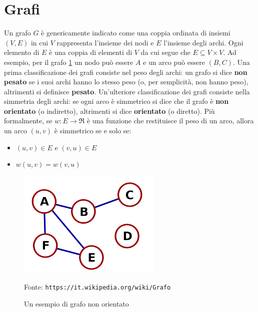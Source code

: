 \documentclass[12pt,a4paper]{book}
\newcommand{\source}[1]{\caption*{Fonte: {\small\texttt{#1}}} }
\begin{document}
	\section{Grafi}
	Un grafo $G$ è genericamente indicato come una coppia ordinata di insiemi $(V,E)$ in cui $V$ rappresenta l'insieme dei nodi e $E$ l'insieme degli archi. Ogni elemento di $E$ è una coppia di elementi di $V$ da cui segue che $E \subseteq V \times V$. Ad esempio, per il grafo \ref{fig:grafo-esempio} un nodo può essere $A$ e un arco può essere $(B,C)$. Una prima classificazione dei grafi consiste nel peso degli archi: un grafo si dice \textbf{non pesato} se i suoi archi hanno lo stesso peso (o, per semplicità, non hanno peso), altrimenti si definisce \textbf{pesato}. Un'ulteriore classificazione dei grafi consiste nella simmetria degli archi: se ogni arco è simmetrico si dice che il grafo è \textbf{non orientato} (o indiretto), altrimenti si dice \textbf{orientato} (o diretto). Più formalmente, se $w:E \rightarrow \Re$ è una funzione che restituisce il peso di un arco, allora un arco $(u,v)$ è simmetrico se e solo se:
	\begin{itemize}
		\item $(u,v) \in E$ e $(v,u) \in E$
		\item $w(u,v) = w(v,u)$
	\end{itemize}

	\begin{figure}
		\centering
		\includegraphics[width=0.5\linewidth]{grafo-esempio}
		\caption{Un esempio di grafo non orientato}
		\source{https://it.wikipedia.org/wiki/Grafo}
		\label{fig:grafo-esempio}
	\end{figure}
\end{document}
